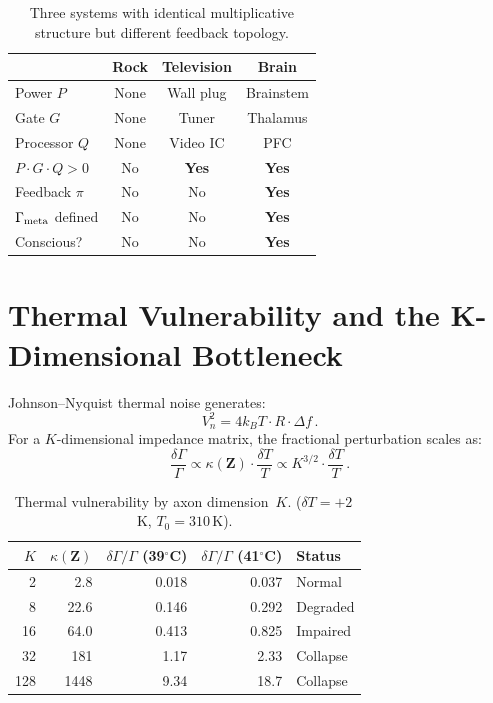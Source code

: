 \documentclass[aps,pre,twocolumn,superscriptaddress,floatfix]{revtex4-2}
\begin{document}
\begin{table}[h]
\centering
\caption{Three systems with identical multiplicative
structure but different feedback topology.}
\label{tab:three-systems}
\begin{tabular}{@{}lccc@{}}
\toprule
 & Rock & Television & Brain \\
\midrule
Power $P$ & None & Wall plug & Brainstem \\
Gate $G$ & None & Tuner & Thalamus \\
Processor $Q$ & None & Video IC & PFC \\
$P\!\cdot\!G\!\cdot\!Q > 0$ & No & \textbf{Yes} & \textbf{Yes} \\
Feedback $\pi$ & No & No & \textbf{Yes} \\
$\Gamma_{\text{meta}}$ defined & No & No & \textbf{Yes} \\
Conscious? & No & No & \textbf{Yes} \\
\bottomrule
\end{tabular}
\end{table}



\section{Thermal Vulnerability and the K-Dimensional Bottleneck}
\label{sec:thermal}

Johnson--Nyquist thermal noise generates:
\begin{equation}
  V_n^2 = 4 k_B T \cdot R \cdot \Delta f\,.
  \label{eq:JN}
\end{equation}
For a $K$-dimensional impedance matrix, the fractional
perturbation scales as:
\begin{equation}
  \frac{\delta\Gamma}{\Gamma}
    \propto \kappa(\mathbf{Z}) \cdot \frac{\delta T}{T}
    \propto K^{3/2} \cdot \frac{\delta T}{T}\,.
  \label{eq:thermal-vulnerability}
\end{equation}

\begin{table}[h]
\centering
\caption{Thermal vulnerability by axon dimension~$K$.
($\delta T=+2$\,K, $T_0=310$\,K).}
\label{tab:thermal-K}
\begin{tabular}{@{}rrrrl@{}}
\toprule
$K$ & $\kappa(\mathbf{Z})$ & $\delta\Gamma/\Gamma$ (39$^\circ$C)
    & $\delta\Gamma/\Gamma$ (41$^\circ$C) & Status \\
\midrule
2   & 2.8    & 0.018  & 0.037  & Normal \\
8   & 22.6   & 0.146  & 0.292  & Degraded \\
16  & 64.0   & 0.413  & 0.825  & Impaired \\
32  & 181    & 1.17   & 2.33   & Collapse \\
128 & 1448   & 9.34   & 18.7   & Collapse \\
\bottomrule
\end{tabular}
\end{table}
\end{document}
